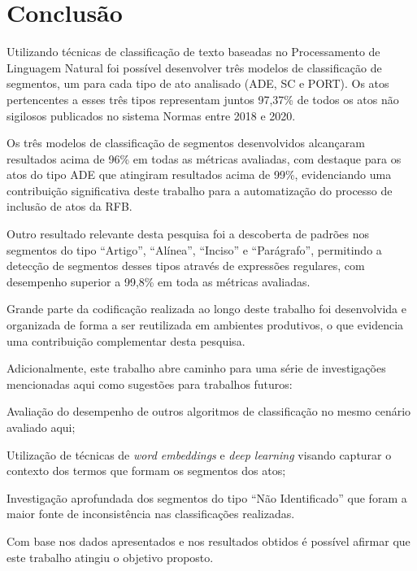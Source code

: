 \section{Conclusão}

Utilizando técnicas de classificação de texto baseadas no Processamento de Linguagem Natural foi possível desenvolver três modelos de classificação de segmentos, um para cada tipo de ato analisado (ADE, SC e PORT). Os atos pertencentes a esses três tipos representam juntos 97,37\% de todos os atos não sigilosos publicados no sistema Normas entre 2018 e 2020.

Os três modelos de classificação de segmentos desenvolvidos alcançaram resultados acima de 96\% em todas as métricas avaliadas, com destaque para os atos do tipo ADE que atingiram resultados acima de 99\%, evidenciando uma contribuição significativa deste trabalho para a automatização do processo de inclusão de atos da RFB.

Outro resultado relevante desta pesquisa foi a descoberta de padrões nos segmentos do tipo ``Artigo'', ``Alínea'', ``Inciso'' e ``Parágrafo'', permitindo a detecção de segmentos desses tipos através de expressões regulares, com desempenho superior a 99,8\% em toda as métricas avaliadas. 

Grande parte da codificação realizada ao longo deste trabalho foi desenvolvida e organizada de forma a ser reutilizada em ambientes produtivos, o que evidencia uma contribuição complementar desta pesquisa.

Adicionalmente, este trabalho abre caminho para uma série de investigações mencionadas aqui como sugestões para trabalhos futuros: 
\begin{alineas}
	\item Avaliação do desempenho de outros algoritmos de classificação no mesmo cenário avaliado aqui;
	\item Utilização de técnicas de \textit{word embeddings} e \textit{deep learning} visando capturar o contexto dos termos que formam os segmentos dos atos;
	\item Investigação aprofundada dos segmentos do tipo ``Não Identificado'' que foram a maior fonte de inconsistência nas classificações realizadas.
\end{alineas}

Com base nos dados apresentados e nos resultados obtidos é possível afirmar que este trabalho atingiu o objetivo proposto.


\begin{figure}
\label{fig:fake}
\end{figure}